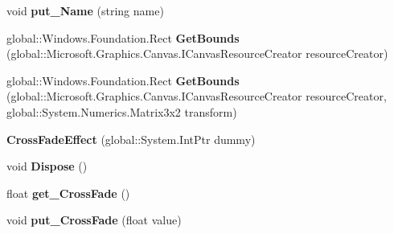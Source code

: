\begin{DoxyCompactItemize}
void {\bfseries put\+\_\+\+Name} (string name)
\item 
\mbox{\label{class_microsoft_1_1_graphics_1_1_canvas_1_1_effects_1_1_cross_fade_effect_a8c0163e4f456fdcaef36eb8260fbcd61}} 
global\+::\+Windows.\+Foundation.\+Rect {\bfseries Get\+Bounds} (global\+::\+Microsoft.\+Graphics.\+Canvas.\+I\+Canvas\+Resource\+Creator resource\+Creator)
\item 
\mbox{\label{class_microsoft_1_1_graphics_1_1_canvas_1_1_effects_1_1_cross_fade_effect_ab77a284b694bb6816a8514e82b3924f0}} 
global\+::\+Windows.\+Foundation.\+Rect {\bfseries Get\+Bounds} (global\+::\+Microsoft.\+Graphics.\+Canvas.\+I\+Canvas\+Resource\+Creator resource\+Creator, global\+::\+System.\+Numerics.\+Matrix3x2 transform)
\item 
\mbox{\label{class_microsoft_1_1_graphics_1_1_canvas_1_1_effects_1_1_cross_fade_effect_a1ccb8010e1721e5b73f7f2d332372d07}} 
{\bfseries Cross\+Fade\+Effect} (global\+::\+System.\+Int\+Ptr dummy)
\item 
\mbox{\label{class_microsoft_1_1_graphics_1_1_canvas_1_1_effects_1_1_cross_fade_effect_a7e3429fb00e0d8c989d1ee019f8e917d}} 
void {\bfseries Dispose} ()
\item 
\mbox{\label{class_microsoft_1_1_graphics_1_1_canvas_1_1_effects_1_1_cross_fade_effect_a03a1b2e46780db48c746c36e0a0328df}} 
float {\bfseries get\+\_\+\+Cross\+Fade} ()
\item 
\mbox{\label{class_microsoft_1_1_graphics_1_1_canvas_1_1_effects_1_1_cross_fade_effect_a1bb024927d16d9d1077994bdd49ff1b3}} 
void {\bfseries put\+\_\+\+Cross\+Fade} (float value)
\item 
\mbox{\label{class_microsoft_1_1_graphics_1_1_canvas_1_1_effects_1_1_cross_fade_effect_ae64842db8377a81fbe51b6e9c8230622}} 

\end{DoxyCompactItemize}
